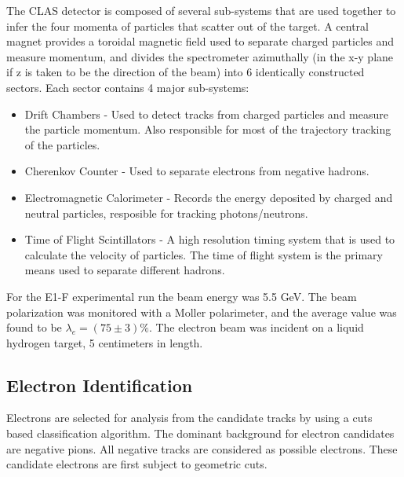 The CLAS detector is composed of several sub-systems that are used together to infer the four momenta of particles that scatter out of the target.  A central magnet provides a toroidal magnetic field used to separate charged particles and measure momentum, and divides the spectrometer azimuthally (in the x-y plane if z is taken to be the direction of the beam) into 6 identically constructed sectors.  Each sector contains 4 major sub-systems: 

\begin{itemize}
	\item Drift Chambers - Used to detect tracks from charged particles and measure the particle momentum.  Also responsible for most of the trajectory tracking of the particles.
	\item Cherenkov Counter - Used to separate electrons from negative hadrons.
	\item Electromagnetic Calorimeter - Records the energy deposited by charged and neutral particles, resposible for tracking photons/neutrons.
	\item Time of Flight Scintillators - A high resolution timing system that is used to calculate the velocity of particles.  The time of flight system is the primary means used to separate different hadrons.  
\end{itemize}

For the E1-F experimental run the beam energy was 5.5 GeV.  The beam polarization was monitored with a Moller polarimeter, and the average value was found to be $\lambda_e = (75 \pm 3) \%$.  The electron beam was incident on a liquid hydrogen target, 5 centimeters in length. \\

\subsection{Electron Identification}
Electrons are selected for analysis from the candidate tracks by using a cuts based classification algorithm.  The dominant background for electron candidates are negative pions.  All negative tracks are considered as possible electrons.  These candidate electrons are first subject to geometric cuts.  
\\

